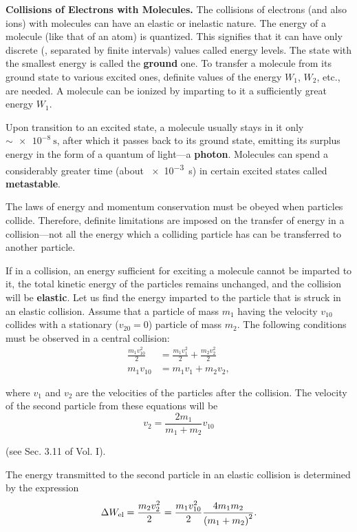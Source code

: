 \textbf{Collisions of Electrons with Molecules.} The collisions of electrons (and also ions) with molecules can have an elastic or inelastic nature.
The energy of a molecule (like that of an atom) is quantized.
This signifies that it can have only discrete (\ie, separated by finite intervals) values called energy levels.
The state with the smallest energy is called the \textbf{ground} one.
To transfer a molecule from its ground state to various excited ones, definite values of the energy $W_1$, $W_2$, etc., are needed.
A molecule can be ionized by imparting to it a sufficiently great energy $W_1$.

Upon transition to an excited state, a molecule usually stays in it only $\sim\SI{e-8}{\second}$, after which it passes back to its ground state, emitting its surplus energy in the form of a quantum of light---a \textbf{photon}.
Molecules can spend a considerably greater time (about \SI{e-3}{\second}) in certain excited states called \textbf{metastable}.

The laws of energy and momentum conservation must be obeyed when particles collide.
Therefore, definite limitations are imposed on the transfer of energy in a collision---not all the energy which a colliding particle has can be transferred to another particle.

If in a collision, an energy sufficient for exciting a molecule cannot be imparted to it, the total kinetic energy of the particles remains unchanged, and the collision will be \textbf{elastic}.
Let us find the energy imparted to the particle that is struck in an elastic collision.
Assume that a particle of mass $m_1$ having the velocity $v_{10}$ collides with a stationary ($v_{20}=0$) particle of mass $m_2$. The following conditions must be observed in a central collision:
\begin{align*}
    \frac{m_1v_{10}^2}{2} &= \frac{m_1v_1^2}{2} + \frac{m_2v_2^2}{2}\\
    m_1v_{10} &= m_1v_1 + m_2v_2,
\end{align*}

\noindent
where $v_1$ and $v_2$ are the velocities of the particles after the collision.
The velocity of the second particle from these equations will be
\begin{equation*}
    v_2 = \frac{2 m_1}{m_1 + m_2} v_{10}
\end{equation*}

\noindent
(see Sec. 3.11 of Vol. I).

The energy transmitted to the second particle in an elastic collision is determined by the expression
\begin{equation*}
    \Delta{W_{\text{el}}} = \frac{m_2v_2^2}{2} = \frac{m_1v_{10}^2}{2} \frac{4 m_1 m_2}{\left(m_1 + m_2\right)^2}.
\end{equation*}

